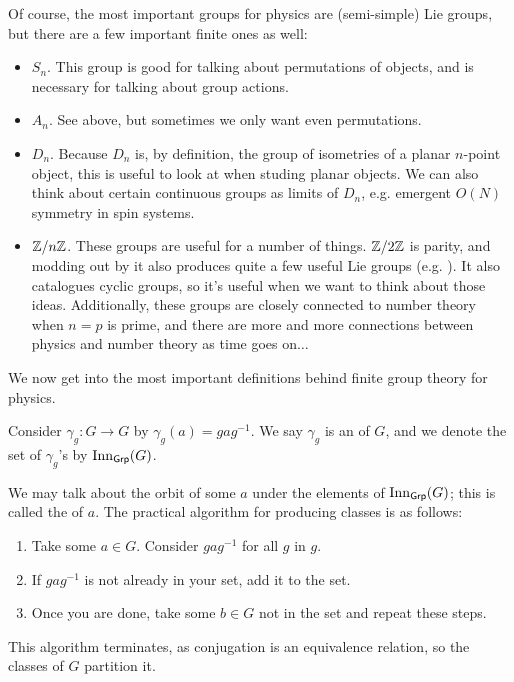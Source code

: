 \documentclass[11pt]{article}
\begin{document}
\begin{eexample}
    Of course, the most important groups for physics are (semi-simple)
    Lie groups, but there are a few important finite ones as well:
    \begin{itemize}
        \item $S_n$. This group is good for talking about permutations
        of objects, and is necessary for talking about group actions.
        \item $A_n$. See above, but sometimes we only want even permutations.
        \item $D_n$. Because $D_n$ is, by definition, the group of isometries
        of a planar $n$-point object, this is useful to look at when studing
        planar objects. We can also think about certain continuous groups
        as limits of $D_n$, e.g. emergent $O(N)$ symmetry in spin systems.
        \item $\mathbb{Z}/n\mathbb{Z}$. These groups are useful for a number of things.
        $\mathbb{Z}/2\mathbb{Z}$ is parity, and modding out by it also produces quite
        a few useful Lie groups (e.g. ). It also
        catalogues cyclic groups, so it's useful when we want to think about
        those ideas. Additionally, these groups are closely connected to number
        theory when $n = p$ is prime, and there are more and more connections
        between physics and number theory as time goes on$\ldots$
    \end{itemize}
\end{eexample}

\noin
We now get into the most important definitions behind finite
group theory for physics.

\begin{definition}
    Consider $\gamma_g \colon G \to G$ by $\gamma_g(a) = g a g^{-1}$.
    We say $\gamma_g$ is an  of $G$, and we
    denote the set of $\gamma_g$'s by $\operatorname{Inn}_{\text{\sffamily{Grp}}}(G)$.
\end{definition}

\noin
We may talk about the orbit of some $a$ under the elements of 
$\operatorname{Inn}_{\text{\sffamily{Grp}}}(G)$; this is called the
 of $a$. The practical algorithm for producing classes
is as follows:
\begin{enumerate}
    \item Take some $a \in G$. Consider $g a g^{-1}$ for all $g$
    in $g$.
    \item If $g a g^{-1}$ is not already in your set, add it to the
    set.
    \item Once you are done, take some $b \in G$ not in the set
    and repeat these steps.
\end{enumerate}
This algorithm terminates, as conjugation is an equivalence relation,
so the classes of $G$ partition it.
\end{document}
